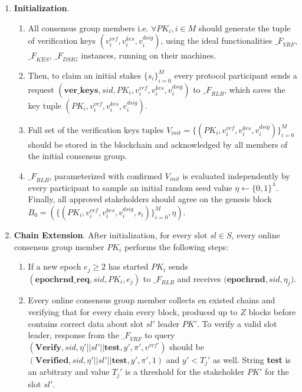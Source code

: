 \begin{enumerate}
    \item \textbf{Initialization}.
    \begin{enumerate}
        \item All consensus group members i.e. $\forall PK_i, i \in M$ should generate the tuple of verification keys ${(v_i^{vrf}, v_i^{kes}, v_i^{dsig})}$, using the ideal functionalities ${\mathcal_{F}}_{VRF}$, ${\mathcal_{F}}_{KES}$, ${\mathcal_{F}}_{DSIG}$ instances, running on their machines.
        \item Then, to claim an initial stakes $\{s_i\}_{i=0}^M$ every protocol participant sends a request ${(\textbf{ver\_keys}, sid, PK_i, v_i^{vrf}, v_i^{kes}, v_i^{dsig})}$ to ${\mathcal_{F}}_{RLB}$, which saves the key tuple ${(PK_i, v_i^{vrf}, v_i^{kes}, v_i^{dsig})}$.
        \item Full set of the verification keys tuples ${V_{init} = \{(PK_i, v_i^{vrf}, v_i^{kes}, v_i^{dsig})\}_{i=0}^M}$ should be stored in the blockchain and acknowledged by all members of the initial consensus group.
        \item ${\mathcal_{F}}_{RLB}$, parameterized with confirmed $V_{init}$ is evaluated independently by every participant to sample an initial random seed value $\eta \leftarrow \{0, 1\}^\lambda$.
              Finally, all approved stakeholders should agree on the genesis block ${B_0=\left(\{(PK_i, v_i^{vrf}, v_i^{kes}, v_i^{dsig}, s_i)\}_{i=0}^M, \eta\right)}$.
    \end{enumerate}
    \item \textbf{Chain Extension}.
    After initialization, for every slot $sl \in S$, every online consensus group member $PK_i$ performs the following steps:
    \begin{enumerate}
        \item If a new epoch ${e_j \geqslant 2}$ has started $PK_i$ sends ${(\textbf{epochrnd\_req}, sid, PK_i, e_j)}$ to ${\mathcal_{F}}_{RLB}$ and receives $({\textbf{epochrnd}, sid, \eta_j)}$.
        \item Every online consensus group member collects en existed chains and verifying that for every chain every block, produced up to $Z$ blocks before contains correct data about slot $sl'$ leader $PK'$.
        To verify a valid slot leader, response from the ${\mathcal_{F}}_{VRF}$ to query ${(\textbf{Verify}, sid, \eta' || sl' || \textbf{test}, y', \pi', v^{vrf'})}$ should be ${(\textbf{Verified}, sid, \eta' || sl' || \textbf{test}, y', \pi', 1)}$ and $y'<T_j'$ as well.
        String \textbf{test} is an arbitrary and value $T_j'$ is a threshold for the stakeholder $PK'$ for the slot $sl'$.


\end{enumerate}
\end{enumerate}
